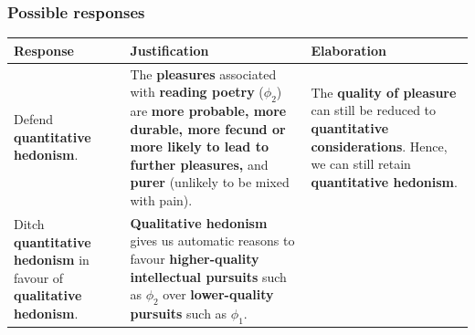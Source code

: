 \documentclass[11pt]{article}
\begin{document}
\subsubsection{Possible responses}
\label{sec:org77065ef}
\begin{center}
\begin{tabular}{|m{10em}|m{15em}|m{10em}|}
\hline
Response & Justification & Elaboration\\
\hline
Defend \textbf{quantitative hedonism}. & The \textbf{pleasures} associated with \textbf{reading poetry} (\(\phi_2\)) are \textbf{more probable, more durable, more fecund or more likely to lead to further pleasures,} and \textbf{purer} (unlikely to be mixed with pain). & The \textbf{quality of pleasure} can still be reduced to \textbf{quantitative considerations}. Hence, we can still retain \textbf{quantitative hedonism}.\\
\hline
Ditch \textbf{quantitative hedonism} in favour of \textbf{qualitative hedonism}. & \textbf{Qualitative hedonism} gives us automatic reasons to favour \textbf{higher-quality intellectual pursuits} such as \(\phi_2\) over \textbf{lower-quality pursuits} such as \(\phi_1\). & \\
\hline
\end{tabular}
\end{center}
 \newpage
\end{document}
